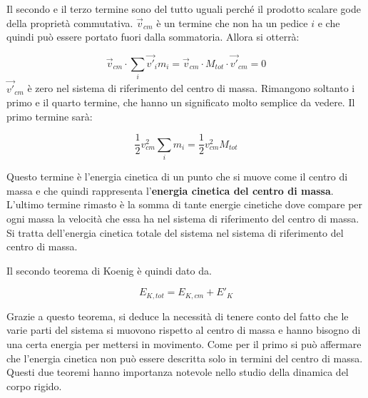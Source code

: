Il secondo e il terzo termine sono del tutto uguali perché il prodotto scalare gode della proprietà commutativa. $\vec{v}_{cm}$ è un termine che non ha un pedice $i$ e che quindi può essere portato fuori dalla sommatoria. Allora si otterrà:

\[
	\vec{v}_{cm} \cdot \sum_i \vec{v'}_i m_i = \vec{v}_{cm}\cdot M_{tot}\cdot \vec{v'}_{cm} = 0
\]
$\vec{v'}_{cm}$ è zero nel sistema di riferimento del centro di massa.
Rimangono soltanto i primo e il quarto termine, che hanno un significato molto semplice da vedere. Il primo termine sarà:

\[
	\frac{1}{2} v_{cm}^2 \sum_i m_i = \frac{1}{2} v_{cm}^2 M_{tot}
\]

Questo termine è l'energia cinetica di un punto che si muove come il centro di massa e che quindi rappresenta l'\textbf{energia cinetica del centro di massa}.
L'ultimo termine rimasto è la somma di tante energie cinetiche dove compare per ogni massa la velocità che essa ha nel sistema di riferimento del centro di massa. Si tratta dell'energia cinetica totale del sistema nel sistema di riferimento del centro di massa.

Il secondo teorema di Koenig è quindi dato da.

\[
	\boxed{E_{K,tot} = E_{K,cm} + E'_K}
\]

Grazie a questo teorema, si deduce la necessità di tenere conto del fatto che le varie parti del sistema si muovono rispetto al centro di massa e hanno bisogno di una certa energia per mettersi in movimento.
Come per il primo si può affermare che l'energia cinetica non può essere descritta solo in termini del centro di massa.
Questi due teoremi hanno importanza notevole nello studio della dinamica del corpo rigido.
